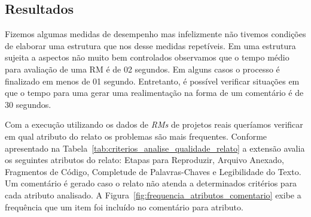 \subsection{Resultados}
\label{sub:implementacao_extensao_avaliacao_resultados}

Fizemos algumas medidas de desempenho mas infelizmente não tivemos condições de
elaborar uma estrutura que nos desse medidas repetíveis. Em uma estrutura
sujeita a aspectos não muito bem controlados observamos que o tempo médio para
avaliação de uma RM é de 02 segundos. Em alguns casos o processo é finalizado em
menos de 01 segundo. Entretanto, é possível verificar situações em que o tempo
para uma gerar uma realimentação na forma de um comentário é de 30 segundos.


Com a execução utilizando os dados de \textit{RMs} de projetos reais queríamos
verificar em qual atributo do relato os problemas são mais frequentes.
Conforme apresentado na Tabela~\ref{tab:criterios_analise_qualidade_relato} a
extensão avalia os seguintes atributos do relato: Etapas para Reproduzir,
Arquivo Anexado, Fragmentos de Código, Completude de Palavras-Chaves e
Legibilidade do Texto. Um comentário é gerado caso o relato não atenda a
determinados critérios para cada atributo analisado. A
Figura~\ref{fig:frequencia_atributos_comentario} exibe a frequência que um item
foi incluído no comentário para atributo.

